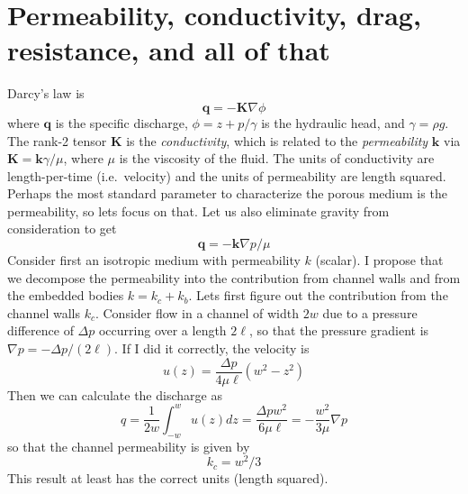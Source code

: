 \documentclass[11pt]{article}
\newcommand{\grad}{\nabla}
\newcommand{\bvec}[1]{\ensuremath{\boldsymbol{#1}}}
\newcommand {\bq} {\bvec{q}}
\begin{document}
\section{Permeability, conductivity, drag, resistance, and all of that}

Darcy's law is
\begin{equation}
\bq = - \bvec{K} \grad \phi
\end{equation}
where $\bq$ is the specific discharge, $\phi = z + p/\gamma$ is the hydraulic head, and $\gamma = \rho g$. The rank-2 tensor $\bvec{K}$ is the {\em conductivity}, which is related to the {\em permeability} $\bvec{k}$ via $\bvec{K} = \bvec{k} \gamma/\mu$, where $\mu$ is the viscosity of the fluid. The units of conductivity are length-per-time (i.e.~velocity) and the units of permeability are length squared.
Perhaps the most standard parameter to characterize the porous medium is the permeability, so lets focus on that. Let us also eliminate gravity from consideration to get
\begin{equation}
\bq = - \bvec{k} \grad p / \mu
\end{equation}
Consider first an isotropic medium with permeability $k$ (scalar). I propose that we decompose the permeability into the contribution from channel walls and from the embedded bodies $k = k_{c} + k_{b}$. Lets first figure out the contribution from the channel walls $k_c$. Consider flow in a channel of width $2w$ due to a pressure difference of $\Delta p$ occurring over a length $2 \ell$, so that the pressure gradient is $\grad p = -\Delta p/(2 \ell)$. If I did it correctly, the velocity is
\begin{equation}
u(z) = \frac{\Delta p}{4 \mu \ell} (w^2 - z^2)
\end{equation}
Then we can calculate the discharge as
\begin{equation}
q = \frac{1}{2w} \int_{-w}^{w} u(z) dz = \frac{\Delta p w^2}{6 \mu \ell} = - \frac{w^2}{3 \mu} \grad p
\end{equation}
so that the channel permeability is given by
\begin{equation}
k_c = w^2/3
\end{equation}
This result at least has the correct units (length squared).
\end{document}
